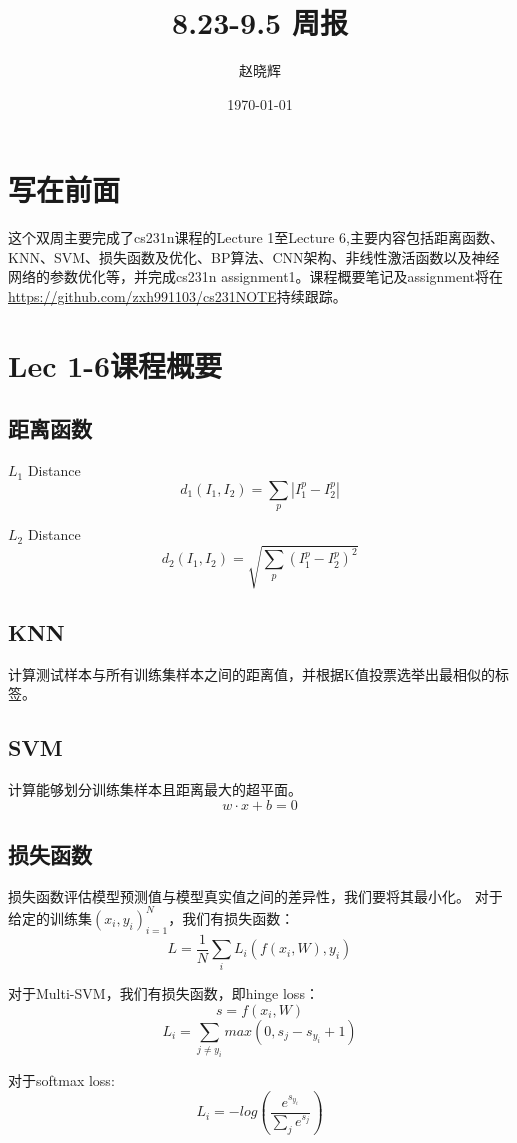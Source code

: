 \documentclass[a4paper]{article}
\title{8.23-9.5 周报}
\author{赵晓辉}
\date{\today}
\begin{document}
\maketitle

\section{写在前面}

这个双周主要完成了cs231n课程的Lecture 1至Lecture 6,主要内容包括距离函数、KNN、SVM、损失函数及优化、BP算法、CNN架构、非线性激活函数以及神经网络的参数优化等，并完成cs231n assignment1。课程概要笔记及assignment将在\url{https://github.com/zxh991103/cs231NOTE}持续跟踪。




\section{Lec 1-6课程概要}
\subsection{距离函数}

$L_1$ Distance
$$d_1(I_1,I_2)=\sum_p|I^p_1-I^p_2|$$

$L_2$ Distance
$$d_2(I_1,I_2) = \sqrt{\sum_p(I^p_1-I^p_2)^2}$$

\subsection{KNN}

计算测试样本与所有训练集样本之间的距离值，并根据K值投票选举出最相似的标签。

\subsection{SVM}

计算能够划分训练集样本且距离最大的超平面。
$$w\cdot x + b=0$$

\subsection{损失函数}
损失函数评估模型预测值与模型真实值之间的差异性，我们要将其最小化。
对于给定的训练集${(x_i,y_i)}^N_{i=1}$，我们有损失函数：
$$L =\frac{1}{N} \sum_i L_i(f(x_i,W),y_i)$$

对于Multi-SVM，我们有损失函数，即hinge loss：
$$s=f(x_i,W)$$
$$L_i=\sum_{j\neq y_i}max(0,s_j-s_{y_i}+1)$$

对于softmax loss:
$$L_i = -log (\frac{e^{s_{y_i}}}{\sum_j e^{s_{j}}})$$
\end{document}
